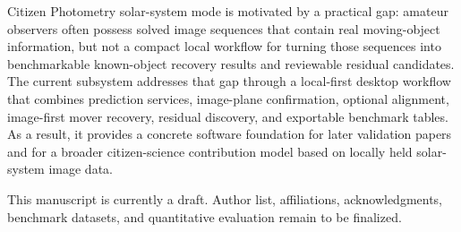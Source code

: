 \documentclass[modern]{aastex701}
\begin{document}
Citizen Photometry solar-system mode is motivated by a practical gap: amateur observers often possess solved image sequences that contain real moving-object information, but not a compact local workflow for turning those sequences into benchmarkable known-object recovery results and reviewable residual candidates. The current subsystem addresses that gap through a local-first desktop workflow that combines prediction services, image-plane confirmation, optional alignment, image-first mover recovery, residual discovery, and exportable benchmark tables. As a result, it provides a concrete software foundation for later validation papers and for a broader citizen-science contribution model based on locally held solar-system image data.

\begin{acknowledgments}
This manuscript is currently a draft. Author list, affiliations, acknowledgments, benchmark datasets, and quantitative evaluation remain to be finalized.
\end{acknowledgments}




\end{document}
